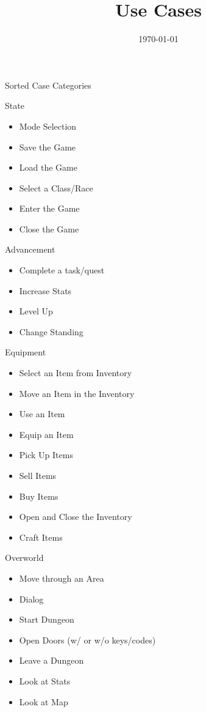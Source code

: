 \documentclass[12pt]{article}
\title{Use Cases}
\date{\today}
\begin{document}
\begin{section}{Sorted Case Categories}
\begin{subsection}{State}
\begin{itemize}
\item Mode Selection
\item Save the Game
\item Load the Game
\item Select a Class/Race
\item Enter the Game
\item Close the Game
\end{itemize}
\end{subsection}

\begin{subsection}{Advancement}
\begin{itemize}
\item Complete a task/quest
\item Increase Stats
\item Level Up
\item Change Standing
\end{itemize}
\end{subsection}

\begin{subsection}{Equipment}
\begin{itemize}
\item Select an Item from Inventory
\item Move an Item in the Inventory
\item Use an Item
\item Equip an Item
\item Pick Up Items
\item Sell Items
\item Buy Items
\item Open and Close the Inventory
\item Craft Items
\end{itemize}
\end{subsection}

\begin{subsection}{Overworld}
\begin{itemize}
\item Move through an Area
\item Dialog
\item Start Dungeon
\item Open Doors (w/ or w/o keys/codes)
\item Leave a Dungeon
\item Look at Stats
\item Look at Map
\end{itemize}
\end{subsection}


\end{section}
\end{document}
